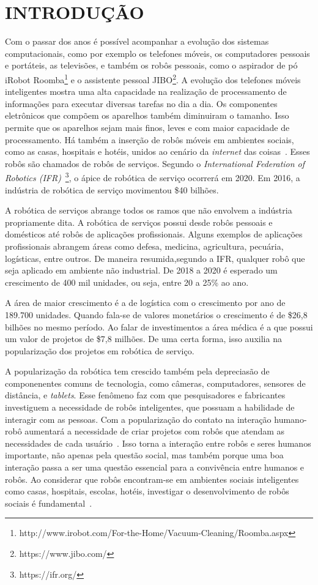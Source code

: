 \chapter{INTRODUÇÃO}
\label{cap:introducao}
Com o passar dos anos é possível acompanhar a evolução dos sistemas computacionais, como por exemplo os telefones móveis, os computadores pessoais e portáteis, as televisões, e também os robôs pessoais, como o aspirador de pó iRobot Roomba\footnote{http://www.irobot.com/For-the-Home/Vacuum-Cleaning/Roomba.aspx} e o assistente pessoal JIBO\footnote{https://www.jibo.com/}. A evolução dos telefones móveis inteligentes mostra uma alta capacidade na realização de processamento de informações para executar diversas tarefas no dia a dia. Os componentes eletrônicos que compõem os aparelhos também diminuiram o tamanho. Isso permite que os aparelhos sejam mais finos, leves e com maior capacidade de processamento. Há também a inserção de robôs móveis em ambientes sociais, como as casas, hospitais e hotéis, unidos ao cenário da \emph{internet} das coisas~\cite{heenan:2014}. Esses robôs são chamados de robôs de serviços. Segundo o \textit{International Federation of Robotics (IFR)}~\footnote{https://ifr.org/}, o ápice de robótica de serviço ocorrerá em 2020. Em 2016, a indústria de robótica de serviço movimentou \$40 bilhões.

A robótica de serviços abrange todos os ramos que não envolvem a indústria propriamente dita. A robótica de serviços possui desde robôs pessoais e domésticos até robôs de aplicações profissionais. Alguns exemplos de aplicações profissionais abrangem áreas como defesa, medicina, agricultura, pecuária, logísticas, entre outros. De maneira resumida,segundo a IFR, qualquer robô que seja aplicado em ambiente não industrial. De 2018 a 2020 é esperado um crescimento de 400 mil unidades, ou seja, entre 20 a 25\% ao ano.

A área de maior crescimento é a de logística com o crescimento por ano de 189.700 unidades. Quando fala-se de valores monetários o crescimento é de \$26,8 bilhões no mesmo período. Ao falar de investimentos a área médica é a que possui um valor de projetos de \$7,8 milhões. De uma certa forma, isso auxilia na popularização dos projetos em robótica de serviço.

A popularização da robótica tem crescido também pela depreciasão de componenentes comuns de tecnologia, como câmeras, computadores, sensores de distância, e \emph{tablets}. Esse fenômeno faz com que pesquisadores e fabricantes investiguem a necessidade de robôs inteligentes, que possuam a habilidade de interagir com as pessoas. Com a popularização do contato na interação humano-robô aumentará a necessidade de criar projetos com robôs que atendam as necessidades de cada usuário~\cite{looi:2012}. Isso torna a interação entre robôs e seres humanos importante, não apenas pela questão social, mas também porque uma boa interação passa a ser uma questão essencial para a convivência entre humanos e robôs. Ao considerar que robôs encontram-se em ambientes sociais inteligentes como casas, hospitais, escolas, hotéis, investigar o desenvolvimento de robôs sociais é fundamental~\cite{albo-canals:2013, brown:2013}.

